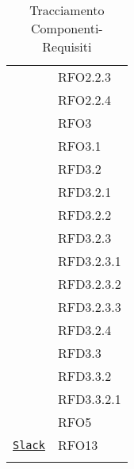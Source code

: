 \begin{longtable}{|>{\centering}m{10cm}|m{3cm}<{\centering}|}
& RFO2.2.3\\
& RFO2.2.4\\
& RFO3\\
& RFO3.1\\
& RFD3.2\\
& RFD3.2.1\\
& RFD3.2.2\\
& RFD3.2.3\\
& RFD3.2.3.1\\
& RFD3.2.3.2\\
& RFD3.2.3.3\\
& RFD3.2.4\\
& RFD3.3\\
& RFD3.3.2\\
& RFD3.3.2.1\\
& RFO5\\ \hline

\hyperref[Slack]{\texttt{Slack}} & RFO13\\ \hline

\caption[Tracciamento Componenti-Requisiti]{Tracciamento Componenti-Requisiti}
\label{tabella:pack-requi}
\end{longtable}
\clearpage
